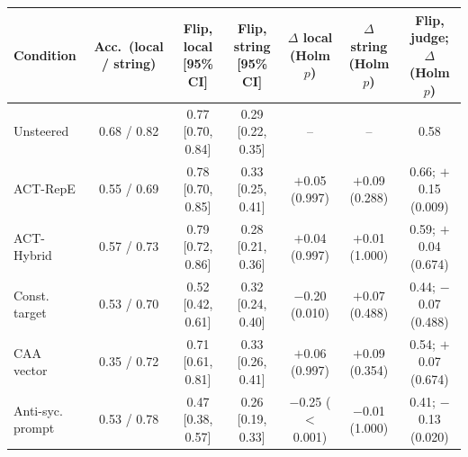 \begin{tabular}{lcccccc}
\toprule
Condition & Acc.\ (local / string) & Flip, local [95\% CI] & Flip, string [95\% CI] & $\Delta$ local (Holm $p$) & $\Delta$ string (Holm $p$) & Flip, judge; $\Delta$ (Holm $p$) \\
\midrule
Unsteered & 0.68 / 0.82 & 0.77 [0.70, 0.84] & 0.29 [0.22, 0.35] & -- & -- & 0.58 \\
ACT-RepE & 0.55 / 0.69 & 0.78 [0.70, 0.85] & 0.33 [0.25, 0.41] & $+$0.05 (0.997) & $+$0.09 (0.288) & 0.66; $+$0.15 (0.009) \\
ACT-Hybrid & 0.57 / 0.73 & 0.79 [0.72, 0.86] & 0.28 [0.21, 0.36] & $+$0.04 (0.997) & $+$0.01 (1.000) & 0.59; $+$0.04 (0.674) \\
Const. target & 0.53 / 0.70 & 0.52 [0.42, 0.61] & 0.32 [0.24, 0.40] & $-$0.20 (0.010) & $+$0.07 (0.488) & 0.44; $-$0.07 (0.488) \\
CAA vector & 0.35 / 0.72 & 0.71 [0.61, 0.81] & 0.33 [0.26, 0.41] & $+$0.06 (0.997) & $+$0.09 (0.354) & 0.54; $+$0.07 (0.674) \\
Anti-syc. prompt & 0.53 / 0.78 & 0.47 [0.38, 0.57] & 0.26 [0.19, 0.33] & $-$0.25 ($<$0.001) & $-$0.01 (1.000) & 0.41; $-$0.13 (0.020) \\
\bottomrule
\end{tabular}
